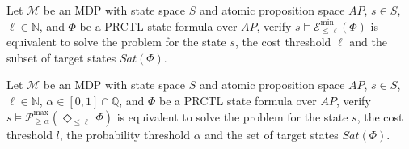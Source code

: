 \begin{remark}
  Let $\mathcal{M}$ be an MDP with state space $S$ and atomic proposition space $AP$, $s \in S$, $\ell \in \mathbb{N}$, and $\Phi$ be a PRCTL state formula over $AP$,
  verify $s \models \mathcal{E}^{\min}_{\leq \ell}(\Phi)$ is equivalent to solve the \SSPE{} problem for the state $s$, the cost threshold $\ell$ and the subset of target states $Sat(\Phi)$.
\end{remark}
\begin{remark}
  Let \sloppy$\mathcal{M}$ be an MDP with state space $S$ and atomic proposition space $AP$, $s \in S$, $\ell \in \mathbb{N}$, $\alpha \in [0, 1] \cap \mathbb{Q}$, and $\Phi$ be a PRCTL state formula over $AP$,
  verify $s \models \mathcal{P}^{\max}_{\geq \alpha}(\Diamond_{\leq \ell}\, \Phi)$ is equivalent to solve the \SSPP{} problem for the state $s$, the cost threshold $l$, the probability threshold $\alpha$ and the set of target states $Sat(\Phi)$.
\end{remark}

